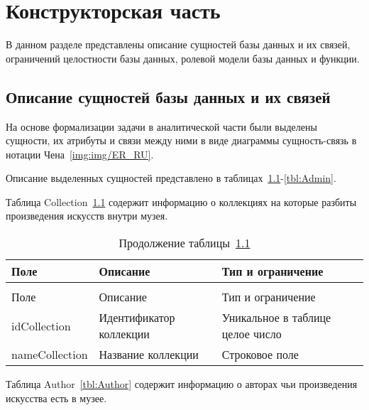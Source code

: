 \chapter{Конструкторская часть}

В данном разделе представлены описание сущностей базы данных и их связей, ограничений целостности базы данных, ролевой модели базы данных и функции.


\section{Описание сущностей базы данных и их связей}

На основе формализации задачи в аналитической части были выделены сущности, их атрибуты и связи между ними в виде диаграммы сущность-связь в нотации Чена~\ref{img:img/ER_RU}.

Описание выделенных сущностей представлено в таблицах~\ref{tbl:Collection}-\ref{tbl:Admin}.

\FloatBarrier
{}
\FloatBarrier



Таблица Collection~\ref{tbl:Collection} содержит информацию о коллекциях на которые разбиты произведения искусств внутри музея.

\begin{longtable}{|
		>{\centering\arraybackslash}m{}|
		>{\centering\arraybackslash}m{}|
		>{\centering\arraybackslash}m{}|
	}
	\caption{Таблица Коллекция (Collection)}\label{tbl:Collection} \\\hline
	Поле & Описание & Тип и ограничение  \\\hline    
	\endfirsthead
	\caption*{Продолжение таблицы~\ref{tbl:Collection} } \\\hline
	Поле & Описание & Тип и ограничение  \\\hline           
	\endhead
	\endfoot
	idCollection & Идентификатор коллекции & Уникальное в таблице целое число \\\hline
	nameCollection & Название коллекции & Строковое поле \\\hline
\end{longtable}

Таблица Author~\ref{tbl:Author} содержит информацию о авторах чьи произведения искусства есть в музее.

